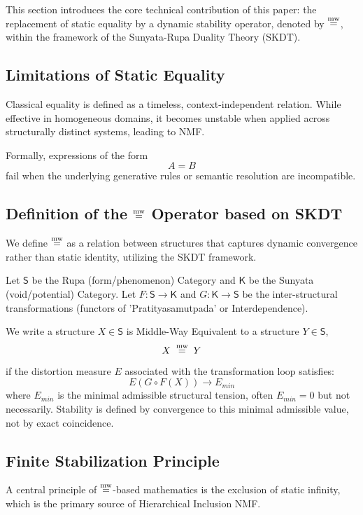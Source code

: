 \documentclass[11pt]{article}
\newcommand{\K}{\mathsf{K}} %
\newcommand{\Sg}{\mathsf{S}} %
\begin{document}
This section introduces the core technical contribution of this paper:
the replacement of static equality by a dynamic stability operator,
denoted by $\mathrel{\overset{\mathrm{mw}}{=}}$, within the framework of the Sunyata-Rupa Duality Theory (SKDT).

\subsection{Limitations of Static Equality}

Classical equality is defined as a timeless, context-independent
relation.
While effective in homogeneous domains, it becomes unstable when
applied across structurally distinct systems, leading to NMF.

Formally, expressions of the form
\[
A = B
\]
fail when the underlying generative rules or semantic resolution are
incompatible.

\subsection{Definition of the $\mathrel{\overset{\mathrm{mw}}{=}}$ Operator based on SKDT}

We define $\mathrel{\overset{\mathrm{mw}}{=}}$ as a relation between structures that captures
dynamic convergence rather than static identity, utilizing the SKDT framework.

\begin{definition}
Let $\Sg$ be the Rupa (form/phenomenon) Category and $\K$ be the Sunyata
(void/potential) Category.
Let $F: \Sg \rightarrow \K$ and $G: \K \rightarrow \Sg$ be the
inter-structural transformations (functors of 'Pratityasamutpada' or
Interdependence).

We write a structure $X \in \Sg$ is Middle-Way Equivalent to a structure
$Y \in \Sg$,
\[
X \; \mathrel{\overset{\mathrm{mw}}{=}} \; Y
\]
if the distortion measure $E$ associated with the transformation loop
satisfies:
\[
E(G \circ F(X)) \rightarrow E_{min}
\]
where $E_{min}$ is the minimal admissible structural tension, often $E_{min}=0$
but not necessarily.
Stability is defined by convergence to this minimal admissible value,
not by exact coincidence.
\end{definition}



\subsection{Finite Stabilization Principle}

A central principle of $\mathrel{\overset{\mathrm{mw}}{=}}$-based mathematics is the exclusion of
static infinity, which is the primary source of Hierarchical Inclusion NMF.
\end{document}
